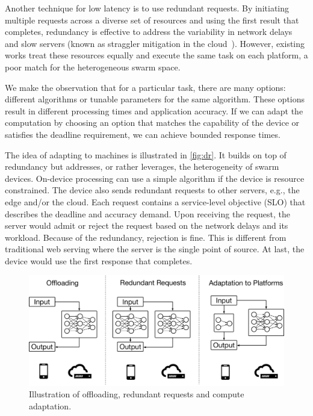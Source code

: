 Another technique for low latency is to use redundant requests. By initiating
multiple requests across a diverse set of resources and using the first result
that completes, redundancy is effective to address the variability in network
delays~\cite{gordon2015accelerating, vulimiri2013low} and slow servers (known as
straggler mitigation in the cloud~\cite{dean2013tail,
  ananthanarayanan2013effective}). However, existing works treat these resources
equally and execute the same task on each platform, a poor match for the
heterogeneous swarm space.

We make the observation that for a particular task, there are many options:
different algorithms or tunable parameters for the same algorithm. These options
result in different processing times and application accuracy. If we can adapt
the computation by choosing an option that matches the capability of the device
or satisfies the deadline requirement, we can achieve bounded response times.

The idea of adapting to machines is illustrated in \autoref{fig:dr}. It builds
on top of redundancy but addresses, or rather leverages, the heterogeneity of
swarm devices.  On-device processing can use a simple algorithm if the device is
resource constrained. The device also sends redundant requests to other servers,
e.g., the edge and/or the cloud. Each request contains a service-level objective
(SLO) that describes the deadline and accuracy demand. Upon receiving the
request, the server would admit or reject the request based on the network
delays and its workload. Because of the redundancy, rejection is fine. This is
different from traditional web serving where the server is the single point of
source. At last, the device would use the first response that completes.

\begin{figure}
  \centering
  \includegraphics[width=0.8\columnwidth]{figures/dr.pdf}
  \caption{Illustration of offloading, redundant requests and compute
    adaptation.}
  \label{fig:dr}
\end{figure}

